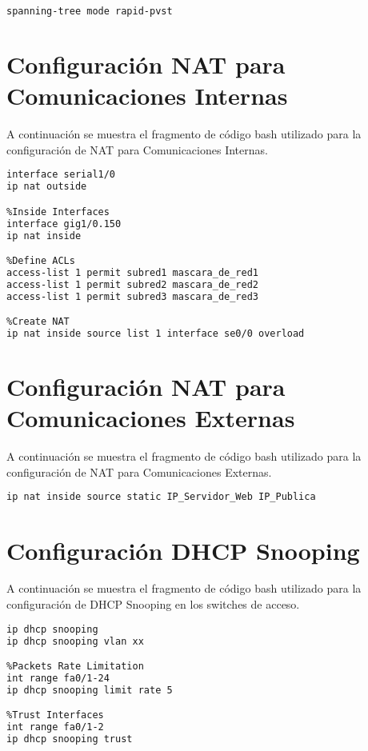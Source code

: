 \begin{lstlisting}[language=Bash, caption={Configuración RSTP}]
spanning-tree mode rapid-pvst 
\end{lstlisting}

\section{Configuración NAT para Comunicaciones Internas}\label{anexo:nat1}
A continuación se muestra el fragmento de código bash utilizado para la configuración de NAT para Comunicaciones Internas.

\begin{lstlisting}[language=Bash, caption={Configuración NAT para Comunicaciones Internas}]
%Outside Interfaces
interface serial1/0 
ip nat outside 

%Inside Interfaces
interface gig1/0.150
ip nat inside 

%Define ACLs
access-list 1 permit subred1 mascara_de_red1
access-list 1 permit subred2 mascara_de_red2
access-list 1 permit subred3 mascara_de_red3

%Create NAT
ip nat inside source list 1 interface se0/0 overload
\end{lstlisting}

\section{Configuración NAT para Comunicaciones Externas}\label{anexo:nat2}
A continuación se muestra el fragmento de código bash utilizado para la configuración de NAT para Comunicaciones Externas.

\begin{lstlisting}[language=Bash, caption={Configuración NAT para Comunicaciones Externas}]
%Create NAT
ip nat inside source static IP_Servidor_Web IP_Publica
\end{lstlisting}


\section{Configuración DHCP Snooping}\label{anexo:snooping}
A continuación se muestra el fragmento de código bash utilizado para la configuración de DHCP Snooping en los switches de acceso.

\begin{lstlisting}[language=Bash, caption={Configuración DHCP Snooping}]
%Active DHCP Snooping
ip dhcp snooping 
ip dhcp snooping vlan xx

%Packets Rate Limitation
int range fa0/1-24 
ip dhcp snooping limit rate 5 

%Trust Interfaces
int range fa0/1-2 
ip dhcp snooping trust 
\end{lstlisting}


